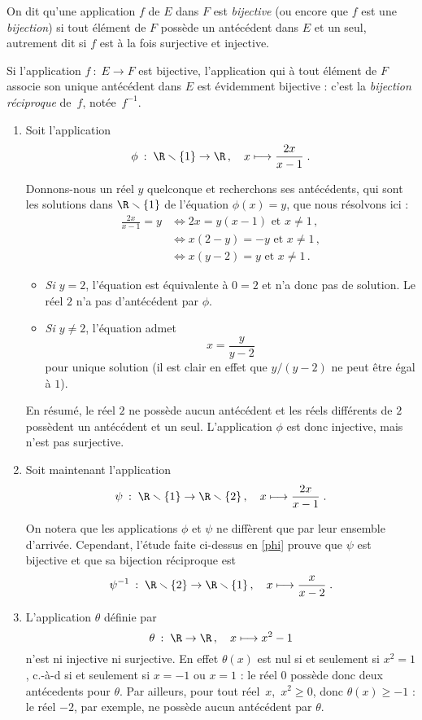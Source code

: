 \begin{remark}[Bijections]
On dit qu'une application $f$ de $E$ dans $F$ est \emph{bijective} (ou encore que $f$ est une \emph{bijection}) si tout élément de $F$ possède un antécédent dans $E$ et un seul, autrement dit si $f$ est à la fois surjective et injective.

Si l'application $f\::\;E\to F$ est bijective, l'application qui à tout élément de $F$ associe son unique antécédent dans $E$ est évidemment bijective : c'est la \emph{bijection réciproque} de~$f$, notée~$f^{-1}$.
\end{remark}
\begin{example}[Exemples]
\begin{enumerate}
\item \label{phi} Soit l'application 
\[
\phi\::\;\R\smallsetminus\{1\}\to\R\,,\quad x\longmapsto \frac{2x}{x-1}\;.
\]

Donnons-nous un réel $y$ quelconque et recherchons ses antécédents, qui sont les solutions dans $\R\smallsetminus\{1\}$ de l'équation $\phi(x)=y$, que nous résolvons ici :
\begin{align*}
\frac{2x}{x-1}=y &\iff 2x=y(x-1)\text{ et } x\neq 1\,,\\
&\iff x(2-y)=-y\text{ et } x\neq 1\,,\\
&\iff x(y-2)=y\text{ et } x\neq 1\,.
\end{align*}
\begin{itemize}
\item\textit{Si $y=2$}, l'équation est équivalente à $0=2$ et n'a donc pas de solution. Le réel $2$ n'a pas d'antécédent par $\phi$.
\item\textit{Si $y\neq 2$}, l'équation admet \[x=\frac{y}{y-2}\] pour unique solution (il est clair en effet que $y/(y-2)$ ne peut être égal à $1$).
\end{itemize}


En résumé, le réel $2$ ne possède aucun antécédent et les réels différents de $2$ possèdent un antécédent et un seul. L'application $\phi$ est donc injective, mais n'est pas surjective.
\item Soit maintenant l'application
\[
\psi\::\;\R\smallsetminus\{1\}\to\R\smallsetminus\{2\}\,,\quad x\longmapsto \frac{2x}{x-1}\;.
\]

On notera que les applications $\phi$ et $\psi$ ne diffèrent que par leur ensemble d'arrivée. Cependant, l'étude faite ci-dessus en \ref{phi} prouve que $\psi$ est bijective et que sa bijection réciproque est 
\[
\psi^{-1}\::\;\R\smallsetminus\{2\}\to\R\smallsetminus\{1\}\,,\quad x\longmapsto \frac{x}{x-2}\;.
\]
\item L'application $\theta$ définie par 
\[
\theta\::\;\R\to\R\,,\quad x\longmapsto x^2-1
\]
n'est ni injective ni surjective. En effet $\theta(x)$ est nul si et seulement si $x^2=1$, c.-à-d si et seulement si $x=-1$ ou $x=1$ : le réel $0$ possède donc deux antécedents pour $\theta$. Par ailleurs, pour tout réel~$x$,~$x^2\geq0$, donc $\theta(x)\geq-1$ : le réel $-2$, par exemple, ne possède aucun antécédent par $\theta$.
\end{enumerate}
\end{example}
